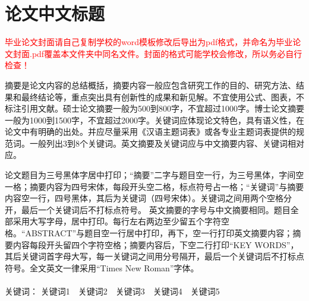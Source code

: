\documentclass[UTF8,12pt,AutoFakeBold,fontset=fandol]{ctexart}
\begin{document}
	\setcounter{page}{1} %
	
	
	
	\setcounter{page}{1} %
	\pagestyle{fancy}%
	\fancyhf{}
	\fancyfoot[C]{\thepage} %
	
	
	\section*{论文中文标题}
	\begin{cnabstract}
		\fontsize{14pt}{17.5pt}\selectfont%
		\textcolor{red}{毕业论文封面请自己复制学校的word模板修改后导出为pdf格式，并命名为毕业论文封面.pdf覆盖本文件夹中同名文件。封面的格式可能学校会修改，所以务必自行检查！}
		\par
		摘要是论文内容的总结概括，摘要内容一般应包含研究工作的目的、研究方法、结果和最终结论等，重点突出具有创新性的成果和新见解。不宜使用公式、图表，不标注引用文献。硕士论文摘要一般为500到800字，不宜超过1000字。博士论文摘要一般为1000到1500字，不宜超过2000字。关键词应体现论文特色，具有语义性，在论文中有明确的出处。并应尽量采用《汉语主题词表》或各专业主题词表提供的规范词。一般列出3到8个关键词。英文摘要及关键词应与中文摘要内容、关键词相对应。
		\par
		论文题目为三号黑体字居中打印；“摘要”二字与题目空一行，为三号黑体，字间空一格；摘要内容为四号宋体，每段开头空二格，标点符号占一格；“关键词”与摘要内容空一行，四号黑体，其后为关键词（四号宋体）。关键词之间用两个空格分开，最后一个关键词后不打标点符号。
		英文摘要的字号与中文摘要相同。题目全部采用大写字母，居中打印。每行左右两边至少留五个字符空格。“ABSTRACT”与题目空一行居中打印，再下，空一行打印英文摘要内容；摘要内容每段开头留四个字符空格；摘要内容后，下空二行打印“KEY WORDS”，其后关键词首字母大写，每一关键词之间用分号隔开，最后一个关键词后不打标点符号。全文英文一律采用“Times New Roman”字体。
		\\
		\\
		\heiti 关键词：
		\songti 关键词1\ \ 关键词2\ \ 关键词3\ \ 关键词4\ \ 关键词5
	\end{cnabstract}
	\pagebreak
\end{document}
